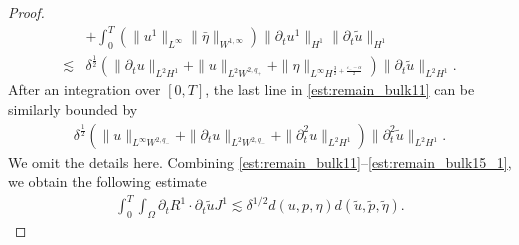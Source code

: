 \documentclass[letterpaper,reqno,10pt,twoside]{amsart}
\theoremstyle{definition}
\theoremstyle{remark}
\def\p{\partial}
\begin{document}
\begin{proof}
\begin{equation}
\begin{aligned}
					&+\int_{0}^{T}(\|u^{1}\|_{L^{\infty}}\|\bar{\eta}\|_{W^{1,\infty}})\|\p_{t}u^{1}\|_{H^{1}}\|\p_{t}\tilde{u}\|_{H^{1}}\\
					\lesssim & \delta^{\frac{1}{2}} (\|\p_{t}u\|_{L^{2}H^{1}}+\|u\|_{L^{2}W^{2,q_{+}}}+\|\eta\|_{L^{\infty}H^{\frac{3}{2}+\frac{\varepsilon_{-}-\alpha}{2}}})\|\p_{t}\tilde{u}\|_{L^{2}H^{1}}.
				\end{aligned}
			\end{equation}
			After an integration over $[0, T]$, the last line in \eqref{est:remain_bulk11} can be similarly bounded by
			\begin{equation}\label{est:remain_bulk15_1}
				\begin{aligned}
					\delta^{\frac{1}{2}}(\|u\|_{L^{\infty}W^{2,q_{-}}}+\|\p_{t}u\|_{L^2W^{2,q_{-}}}+\|\p_{t}^{2}u\|_{L^{2}H^{1}})\|\p_{t}^{2}\tilde{u}\|_{L^{2}H^{1}}.
				\end{aligned}
			\end{equation}
			\noindent We omit the details here.
			\noindent Combining \eqref{est:remain_bulk11}--\eqref{est:remain_bulk15_1}, we obtain the following estimate
			\begin{equation}\label{est:remain_bulk15}
				\begin{aligned}
					\int_{0}^{T}\int_{\Omega}\p_{t}R^{1}\cdot \p_{t}\tilde{u}J^{1}\lesssim \delta^{1/2}d(u,p,\eta)d(\tilde{u},\tilde{p},\tilde{\eta}).
				\end{aligned}
			\end{equation}
			

\end{proof}
\end{document}
